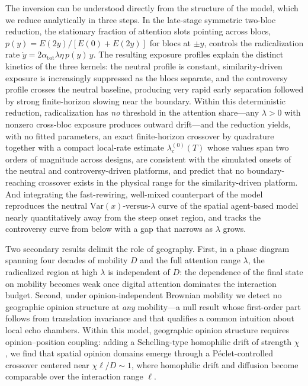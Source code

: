 \documentclass[5p,times,twocolumn]{elsarticle}
\begin{document}
The inversion can be understood directly from the structure of the
model, which we reduce analytically in three steps. In the late-stage
symmetric two-bloc reduction, the stationary fraction of attention slots
pointing across blocs,
$p(y) = E(2y) / [E(0) + E(2y)]$ for blocs at $\pm y$, controls the
radicalization rate $\dot y = 2\alpha_{\mathrm{tot}}\lambda\eta\, p(y)\,
y$. The resulting exposure profiles explain the distinct kinetics of the
three kernels: the neutral profile is constant, similarity-driven exposure
is increasingly suppressed as the blocs separate, and the controversy
profile crosses the neutral baseline, producing very rapid early
separation followed by strong finite-horizon slowing near the boundary. Within this deterministic
reduction, radicalization has \emph{no} threshold in the attention
share---any $\lambda > 0$ with nonzero cross-bloc exposure produces
outward drift---and the reduction yields, with no fitted parameters, an
exact finite-horizon crossover by quadrature together with a compact
local-rate estimate $\lambda_c^{(0)}(T)$ whose values span two orders of
magnitude across designs, are consistent with the simulated onsets of the
neutral and controversy-driven platforms, and predict that no
boundary-reaching crossover exists in the physical range for the
similarity-driven platform. And integrating the fast-rewiring,
well-mixed counterpart of the model reproduces the neutral
$\mathrm{Var}(x)$-versus-$\lambda$ curve of the spatial agent-based model
nearly quantitatively away from the steep onset region, and tracks the
controversy curve from below with a gap that narrows as $\lambda$ grows.

Two secondary results delimit the role of geography. First, in a phase
diagram spanning four decades of mobility $D$ and the full attention range
$\lambda$, the radicalized region at high $\lambda$ is independent of $D$:
the dependence of the final state on mobility becomes weak once digital
attention dominates the interaction budget. Second, under opinion-independent Brownian mobility we detect
no geographic opinion structure at \emph{any} mobility---a null result
whose first-order part follows from translation invariance and that
qualifies a common intuition about local echo chambers. Within this model, geographic opinion structure requires
opinion--position coupling: adding a Schelling-type homophilic drift of
strength $\chi$ \citep{pasimeni2025, djurdjevac2024}, we find that spatial
opinion domains emerge through a P\'eclet-controlled crossover centered near
$\chi \ell / D \sim 1$, where homophilic drift and diffusion become
comparable over the interaction range $\ell$.
\end{document}
